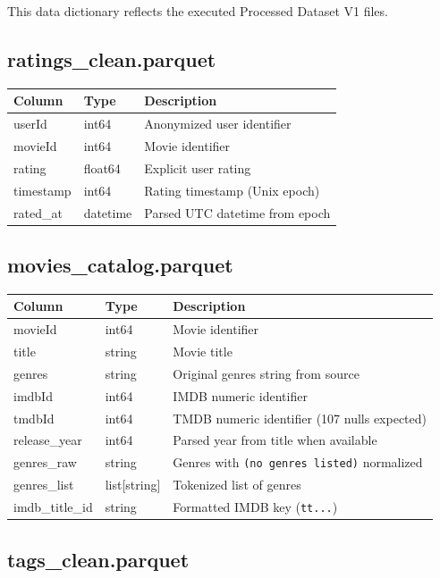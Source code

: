 \documentclass[11pt]{article}
\begin{document}
This data dictionary reflects the executed Processed Dataset V1 files.

\subsection{ratings\_clean.parquet}

\begin{longtable}{@{}p{}p{}p{}@{}}
\toprule
\textbf{Column} & \textbf{Type} & \textbf{Description} \\
\midrule
\endhead
userId & int64 & Anonymized user identifier \\
movieId & int64 & Movie identifier \\
rating & float64 & Explicit user rating \\
timestamp & int64 & Rating timestamp (Unix epoch) \\
rated\_at & datetime & Parsed UTC datetime from epoch \\
\bottomrule
\end{longtable}

\subsection{movies\_catalog.parquet}

\begin{longtable}{@{}p{}p{}p{}@{}}
\toprule
\textbf{Column} & \textbf{Type} & \textbf{Description} \\
\midrule
\endhead
movieId & int64 & Movie identifier \\
title & string & Movie title \\
genres & string & Original genres string from source \\
imdbId & int64 & IMDB numeric identifier \\
tmdbId & int64 & TMDB numeric identifier (107 nulls expected) \\
release\_year & int64 & Parsed year from title when available \\
genres\_raw & string & Genres with \texttt{(no genres listed)} normalized \\
genres\_list & list[string] & Tokenized list of genres \\
imdb\_title\_id & string & Formatted IMDB key (\texttt{tt...}) \\
\bottomrule
\end{longtable}

\subsection{tags\_clean.parquet}
\end{document}
